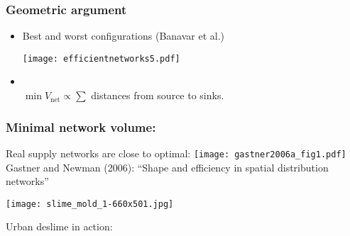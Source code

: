 \begin{frame}
  \frametitle{Geometric argument}

  \begin{block}{}
  \begin{itemize}
  \item<1-> Best and worst configurations (Banavar et al.)
    \begin{center}
      \texttt{[image: efficientnetworks5.pdf]}
    \end{center}
    \bigskip
  \item<2-> \\
    $\min V_{\textrm{net}} \propto \sum$
    distances
    from source to sinks.

  \end{itemize}
  \end{block}

\end{frame}

\begin{frame}
  \frametitle{Minimal network volume:}

  \begin{block}{Real supply networks are close to optimal:}
  \texttt{[image: gastner2006a\_fig1.pdf]}
  \bigskip\\
  {\small 
    Gastner and Newman (2006):
    ``Shape and efficiency in spatial distribution networks''\cite{gastner2006a} 
  }
  \end{block}

\end{frame}

\begin{frame}

  \begin{center}
    \texttt{[image: slime\_mold\_1-660x501.jpg]}
  \end{center}

  Urban deslime in action:  

\end{frame}

